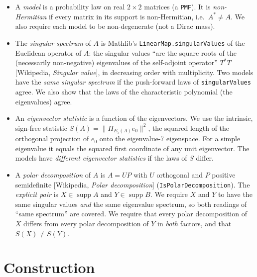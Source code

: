 \documentclass[11pt]{article}
\theoremstyle{definition}
\theoremstyle{remark}
\renewcommand{\_}{\oldus\allowbreak}
\begin{document}
\begin{itemize}[leftmargin=1.5em]
\item A \emph{model} is a probability law on real $2\times2$ matrices (a \texttt{PMF}). It is
\emph{non-Hermitian} if every matrix in its support is non-Hermitian, i.e.\ $A^{*}\ne A$. We also
require each model to be non-degenerate (not a Dirac mass).
\item The \emph{singular spectrum} of $A$ is Mathlib's \texttt{LinearMap.singularValues} of the Euclidean
operator of $A$: the singular values ``are the square roots of the (necessarily non-negative) eigenvalues
of the self-adjoint operator'' $T^*T$ [Wikipedia, \emph{Singular value}], in decreasing order with
multiplicity. Two models have the \emph{same singular spectrum} if the push-forward laws of
\texttt{singularValues} agree. We also show that the laws of the characteristic polynomial (the
eigenvalues) agree.
\item An \emph{eigenvector statistic} is a function of the eigenvectors. We use the intrinsic, sign-free
statistic $S(A)=\|\Pi_{E_7(A)}e_0\|^2$, the squared length of the orthogonal projection of $e_0$ onto the
eigenvalue-7 eigenspace. For a simple eigenvalue it equals the squared first coordinate of any unit
eigenvector. The models have \emph{different eigenvector statistics} if the laws of $S$ differ.
\item A \emph{polar decomposition} of $A$ is $A=UP$ with $U$ orthogonal and $P$ positive semidefinite
[Wikipedia, \emph{Polar decomposition}] (\texttt{IsPolarDecomposition}). The \emph{explicit pair} is
$X\in\operatorname{supp}A$ and $Y\in\operatorname{supp}B$. We require $X$ and $Y$ to have the same
singular values \emph{and} the same eigenvalue spectrum, so both readings of ``same spectrum'' are covered.
We require that every polar decomposition of $X$ differs from every polar decomposition of $Y$ in
\emph{both} factors, and that $S(X)\ne S(Y)$.
\end{itemize}

\section{Construction}
\end{document}
